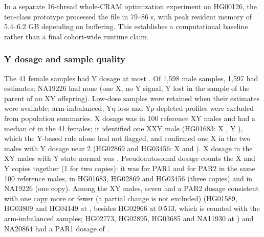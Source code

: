 In a separate 16-thread whole-CRAM optimization experiment on HG00126, the ten-class prototype processed the file in 79--86 s, with peak resident memory of 5.4--6.2 GB depending on buffering. This establishes a computational baseline rather than a final cohort-wide runtime claim.




\subsubsection{Y dosage and sample quality}\label{sec:res-dosage}
The 41 female samples had Y dosage at most . Of 1,598 male samples, 1,597 had estimates; NA19226 had none (one X, no Y signal, Y lost in the sample of the parent of an XY offspring). Low-dose samples were retained when their estimates were available; arm-imbalanced, Yq-loss and Yp-depleted profiles were excluded from population summaries. X dosage was  in 100 reference XY males and had a median of  in the 41 females; it identified one XXY male (HG01683: X , Y ), which the Y-based rule alone had not flagged, and confirmed one X in the two males with Y dosage near 2 (HG02869 and HG03456: X  and ). X dosage in the  XY males with Y state normal was . Pseudoautosomal dosage counts the X and Y copies together (1 for two copies): it was  for PAR1 and  for PAR2 in the same 100 reference males,  in HG01683, HG02869 and HG03456 (three copies) and  in NA19226 (one copy). Among the XY males, seven had a PAR2 dosage consistent with one copy more or fewer (a partial change is not excluded) (HG01589, HG03809 and HG04149 at , besides HG02966 at 0.513, which is counted with the arm-imbalanced samples; HG02773, HG02895, HG03685 and NA11930 at ) and NA20864 had a PAR1 dosage of .

